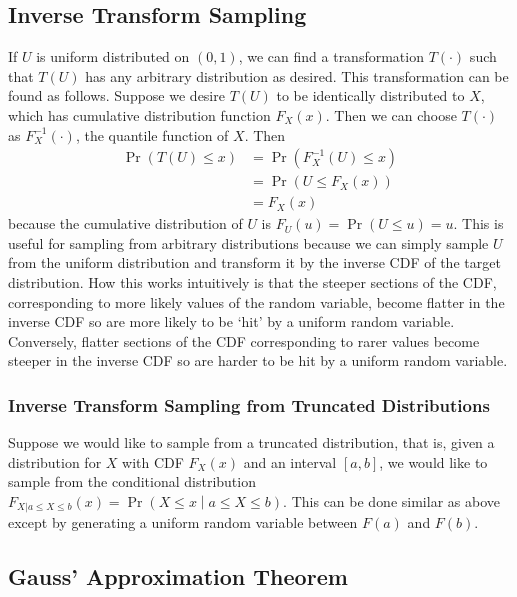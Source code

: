 \documentclass[11pt]{report} %
\begin{document}
\subsection{Inverse Transform Sampling}

If $U$ is uniform distributed on $\left(0, 1\right)$, we can find a transformation $T\left(\cdot\right)$ such that $T\left(U\right)$ has any arbitrary distribution as desired. This transformation can be found as follows. Suppose we desire $T\left(U\right)$ to be identically distributed to $X$, which has cumulative distribution function $F_{X}\left(x\right)$. Then we can choose $T\left(\cdot\right)$ as $F_{X}^{-1}\left(\cdot\right)$, the quantile function of $X$. Then
\begin{align}
\operatorname{Pr}\left(T\left(U\right) \leq x\right) &= \operatorname{Pr}\left(F_{X}^{-1}\left(U\right) \leq x\right) \\
&= \operatorname{Pr}\left(U \leq F_{X}\left(x\right)\right) \\
&= F_{X}\left(x\right)
\end{align}
because the cumulative distribution of $U$ is $F_{U}\left(u\right) = \operatorname{Pr}\left(U \leq u\right) = u$. This is useful for sampling from arbitrary distributions because we can simply sample $U$ from the uniform distribution and transform it by the inverse CDF of the target distribution. How this works intuitively is that the steeper sections of the CDF, corresponding to more likely values of the random variable, become flatter in the inverse CDF so are more likely to be `hit' by a uniform random variable. Conversely, flatter sections of the CDF corresponding to rarer values become steeper in the inverse CDF so are harder to be hit by a uniform random variable.

\subsubsection{Inverse Transform Sampling from Truncated Distributions}

Suppose we would like to sample from a truncated distribution, that is, given a distribution for $X$ with CDF $F_{X}\left(x\right)$ and an interval $\left[a, b\right]$, we would like to sample from the conditional distribution $F_{X|a\leq X\leq b}\left(x\right) = \operatorname{Pr}\left(X \leq x\middle| a \leq X \leq b\right)$. This can be done similar as above except by generating a uniform random variable between $F\left(a\right)$ and $F\left(b\right)$.

\subsection{Gauss' Approximation Theorem \cite{Blom1989}}
\end{document}

